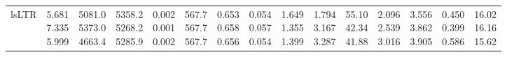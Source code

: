 \begin{landscape}
\begin{table}[t]
{\begin{tabular}{@{}lrrrrrrrrrrrrrr@{}}
lsLTR & \makecell[r]{5.681\\7.335\\5.999} & \makecell[r]{5081.0\\5373.0\\4663.4} & \makecell[r]{5358.2\\5268.2\\5285.9} & \makecell[r]{0.002\\0.001\\0.002} & \makecell[r]{567.7\\567.7\\567.7} & \makecell[r]{0.653\\0.658\\0.656} & \makecell[r]{0.054\\0.057\\0.054} & \makecell[r]{1.649\\1.355\\1.399} & \makecell[r]{1.794\\3.167\\3.287} & \makecell[r]{55.10\\42.34\\41.88} & \makecell[r]{2.096\\2.539\\3.016} & \makecell[r]{3.556\\3.862\\3.905} & \makecell[r]{0.450\\0.399\\0.586} & \makecell[r]{16.02\\16.16\\15.62} \\

\end{tabular}}
\end{table}
\end{landscape}
